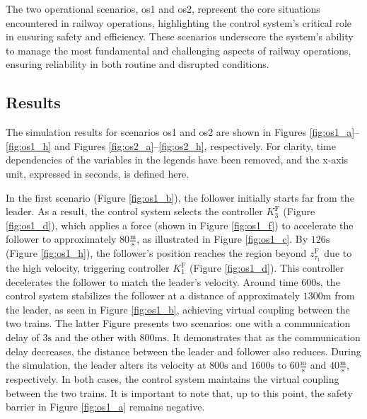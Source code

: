 \documentclass[letterpaper, 10 pt, conference]{ieeeconf}
\theoremstyle{definition}
\theoremstyle{nopoint}
\begin{document}
 
 The two operational scenarios, \gls{os}1 and \gls{os}2, represent the core situations encountered in railway operations, highlighting the control system's critical role in ensuring safety and efficiency. These scenarios underscore the system’s ability to manage the most fundamental and challenging aspects of railway operations, ensuring reliability in both routine and disrupted conditions.
  		
		 \subsection{Results}
		\label{sec:results}
		
		The simulation results for scenarios \gls{os}1 and \gls{os}2 are shown in Figures \ref{fig:os1_a}–\ref{fig:os1_h} and Figures \ref{fig:os2_a}–\ref{fig:os2_h}, respectively. For clarity, time dependencies of the variables in the legends have been removed, and the x-axis unit, expressed in seconds, is defined here.
		
		In the first scenario (Figure \ref{fig:os1_b}), the follower initially starts far from the leader. As a result, the control system selects the controller $K_3^\mathrm{F}$ (Figure \ref{fig:os1_d}), which applies a force (shown in Figure \ref{fig:os1_f}) to accelerate the follower to approximately $80 \frac{\unit{\meter}}{\unit{\second}}$, as illustrated in Figure \ref{fig:os1_c}. By $126\unit{\second}$ (Figure \ref{fig:os1_h}), the follower’s position reaches the region beyond $z_{\tau_1}^\mathrm{F}$ due to the high velocity, triggering controller $K_1^\mathrm{F}$ (Figure \ref{fig:os1_d}). This controller decelerates the follower to match the leader's velocity. Around time $600\unit{\second}$, the control system stabilizes the follower at a distance of approximately $1300 \unit{\meter}$ from the leader, as seen in Figure \ref{fig:os1_b}, achieving virtual coupling between the two trains. The latter Figure presents two scenarios: one with a communication delay of $3 \unit{\second}$ and the other with  $800 \unit{\milli\second}$. It demonstrates that as the communication delay decreases, the distance between the leader and follower also reduces. During the simulation, the leader alters its velocity at $800\unit{\second}$ and $1600\unit{\second}$ to $60 \frac{\unit{\meter}}{\unit{\second}}$ and $40 \frac{\unit{\meter}}{\unit{\second}}$, respectively. In both cases, the control system maintains the virtual coupling between the two trains. It is important to note that, up to this point, the safety barrier in Figure \ref{fig:os1_a} remains negative.
		
\end{document}
